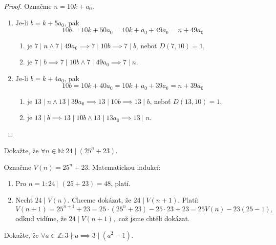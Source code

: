 \begin{proof}
  Označme $n=10k+a_0$.
  \begin{enumerate}[$i.$]
    \item Je-li $b=k+5a_0$, pak
      \[
        10b=10k+50a_0=10k+a_0+49a_0=n+49a_0
      \]
      \begin{enumerate}
        \item[$\implies$] je $7 \mid n \land 7 \mid 49a_0 \implies 7 \mid 10b \implies 7 \mid b \textrm{, neboť } D(7,10)=1$,
        \item[$\impliedby$] je $7 \mid b \implies 7 \mid 10 b \land 7 \mid 49 a_0 \implies 7 \mid n$.
      \end{enumerate}
    \item Je-li $b=k+4a_0$, pak
      \[
        10b=10k+40a_0=10k+a_0+39a_0=n+39a_0
      \]
      \begin{enumerate}
        \item[$\implies$] je $13 \mid n \land 13 \mid 39a_0 \implies 13 \mid 10b \implies 13 \mid b \textrm{, neboť } D(13,10)=1$,
        \item[$\impliedby$] je $13 \mid b \implies  13 \mid 10 b \land 13 \mid 13a_0 \implies 13 \mid n$. \qedhere
      \end{enumerate}
  \end{enumerate}
\end{proof}

\begin{priklad}
Dokažte, že  $\forall n \in \mathbb N\colon 24 \mid (25^n+23).$
\end{priklad}

\begin{reseni}
    Označme $V(n)=25^n+23$. Matematickou indukcí:
    \begin{enumerate}[1.]
        \item Pro $n=1: 24 \mid (25+23) = 48$, platí.
        \item Nechť $24 \mid V(n)$. Chceme dokázat, že $24 \mid V(n+1).$ Platí:
        \[
            V(n+1) = 25^{n+1}+ 23 = 25\cdot (25^n+23)-25\cdot 23+23=25V(n)-23(25-1),
        \]
        odkud vidíme, že $24\mid V(n+1),$ což jsme chtěli dokázat.
    \end{enumerate}
\end{reseni}

\begin{priklad}
Dokažte, že $\forall a \in \mathbb Z\colon 3 \nmid a \implies 3 \mid (a^2-1).$
\end{priklad}

